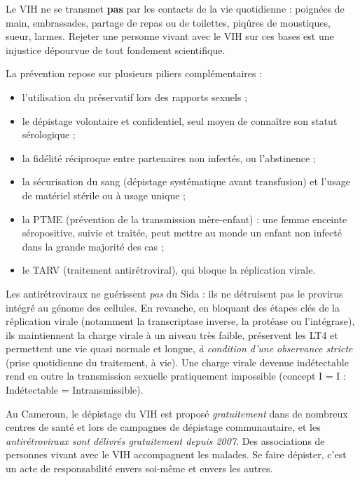\documentclass[11pt]{article}
\newcommand{\cle}[1]{{\popxbold\color{popdark}#1}}
\begin{document}
\begin{attention}
Le VIH ne se transmet \textbf{pas} par les contacts de la vie quotidienne : poignées de main, embrassades, partage de repas ou de toilettes, piqûres de moustiques, sueur, larmes. Rejeter une personne vivant avec le VIH sur ces bases est une injustice dépourvue de tout fondement scientifique.
\end{attention}

La prévention repose sur plusieurs piliers complémentaires :

\begin{itemize}
\item l'utilisation du \cle{préservatif} lors des rapports sexuels ;
\item le \cle{dépistage volontaire et confidentiel}, seul moyen de connaître son statut sérologique ;
\item la \cle{fidélité} réciproque entre partenaires non infectés, ou l'\cle{abstinence} ;
\item la sécurisation du sang (dépistage systématique avant transfusion) et l'usage de matériel stérile ou à usage unique ;
\item la \cle{PTME} (prévention de la transmission mère-enfant) : une femme enceinte séropositive, suivie et traitée, peut mettre au monde un enfant non infecté dans la grande majorité des cas ;
\item le \cle{TARV} (traitement antirétroviral), qui bloque la réplication virale.
\end{itemize}

\begin{propriete}
Les \cle{antirétroviraux} ne guérissent \emph{pas} du Sida : ils ne détruisent pas le provirus intégré au génome des cellules. En revanche, en bloquant des étapes clés de la réplication virale (notamment la transcriptase inverse, la protéase ou l'intégrase), ils maintiennent la charge virale à un niveau très faible, préservent les LT4 et permettent une vie quasi normale et longue, \emph{à condition d'une observance stricte} (prise quotidienne du traitement, à vie). Une charge virale devenue indétectable rend en outre la transmission sexuelle pratiquement impossible (concept I = I : Indétectable = Intransmissible).
\end{propriete}

\begin{savaistu}
Au Cameroun, le dépistage du VIH est proposé \emph{gratuitement} dans de nombreux centres de santé et lors de campagnes de dépistage communautaire, et les \emph{antirétroviraux sont délivrés gratuitement depuis 2007}. Des associations de personnes vivant avec le VIH accompagnent les malades. Se faire dépister, c'est un acte de responsabilité envers soi-même et envers les autres.
\end{savaistu}
\end{document}
